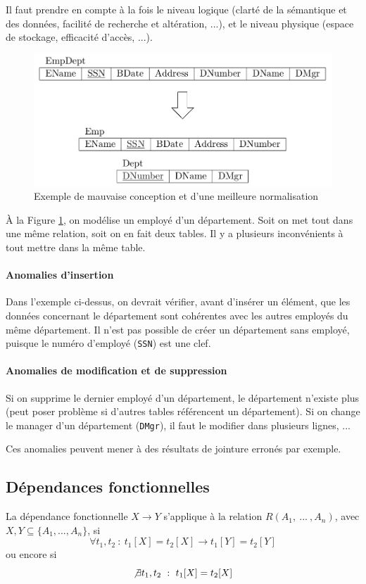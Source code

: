 \documentclass[a4paper]{article}
\begin{document}
Il faut prendre en compte à la fois le niveau logique (clarté de la sémantique et des données,
facilité de recherche et altération, ...), et le niveau physique (espace de stockage, efficacité d'accès, ...).

\begin{figure}[H]
\center
\includegraphics[width=.6\textwidth]{fig/baddesign-norm.png}
\caption{\label{fig:baddesign-norm} Exemple de mauvaise conception et d'une meilleure normalisation}
\end{figure}

\`A la Figure \ref{fig:baddesign-norm}, on modélise un employé d'un département.
Soit on met tout dans une même relation, soit on en fait deux tables. Il y a plusieurs
inconvénients à tout mettre dans la même table.

\paragraph{Anomalies d'insertion}
Dans l'exemple ci-dessus, on devrait vérifier, avant d'insérer un élément, que
les données concernant le département sont cohérentes avec les autres employés
du même département. Il n'est pas possible de créer un département sans employé,
puisque le numéro d'employé (\texttt{SSN}) est une clef.

\paragraph{Anomalies de modification et de suppression}
Si on supprime le dernier employé d'un département, le département n'existe plus
(peut poser problème si d'autres tables référencent un département). Si on change
le manager d'un département (\texttt{DMgr}), il faut le modifier dans plusieurs
lignes, ...

Ces anomalies peuvent mener à des résultats de jointure erronés par exemple.

\subsection{Dépendances fonctionnelles}
La dépendance fonctionnelle $X \rightarrow Y$ s'applique à la relation $R(A_1, ~...~, A_n)$,
avec $X,Y \subseteq \{A_1, ..., A_n\}$, si
$$ \forall t_1,t_2 ~:~ t_1[X] = t_2[X] \rightarrow t_1[Y] = t_2[Y] $$
ou encore si
$$ \not\exists t_1,t_2 ~:~ t_1[X] = t_2[X] $$
\end{document}
